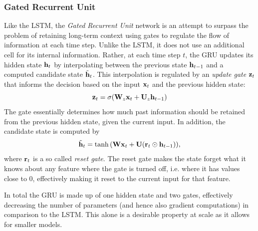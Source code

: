 \documentclass[a4paper,12pt]{article}
\begin{document}

\subsubsection{Gated Recurrent Unit}
\label{section:GRU}
Like the LSTM, the \textit{Gated Recurrent Unit} network is an attempt to surpass the problem of retaining long-term context using gates to regulate the flow of information at each time step. Unlike the LSTM, it does not use an additional cell for its internal information. Rather, at each time step $t$, the GRU updates its hidden state $\mathbf{ h }_{t}$ by interpolating between the previous state $\mathbf{ h }_{t - 1}$ and a computed candidate state $\tilde{\mathbf{ h }}_t$. This interpolation is regulated by an \textit{update gate} $\mathbf{ z }_t$ that informs the decision based on the input $\mathbf{ x }_t$ and the previous hidden state:
\[\mathbf{ z }_t = \sigma{\mathopen{} \left( \mathbf{ W }_z \mathbf{ x }_t + \mathbf{ U }_z \mathbf{ h }_{t-1}  \right) \mathclose{}}\]
The gate essentially determines how much past information should be retained from the previous hidden state, given the current input. In addition, the candidate state is computed by
\[\tilde{\mathbf{ h }}_t = \operatorname{tanh}{\mathopen{} \left( \mathbf{ Wx }_t + \mathbf{ U }{\mathopen{} \left( \mathbf{ r }_t \odot \mathbf{ h }_{t-1} \right) \mathclose{}} \right) \mathclose{}},\]
where $\mathbf{ r }_t$ is a so called \textit{reset gate}. The reset gate makes the state forget what it knows about any feature where the gate is turned off, i.e. where it has values close to 0, effectively making it reset to the current input for that feature. 

In total the GRU is made up of one hidden state and two gates, effectively decreasing the number of parameters (and hence also gradient computations) in comparison to the LSTM. This alone is a desirable property at scale as it allows for smaller models.
\end{document}
